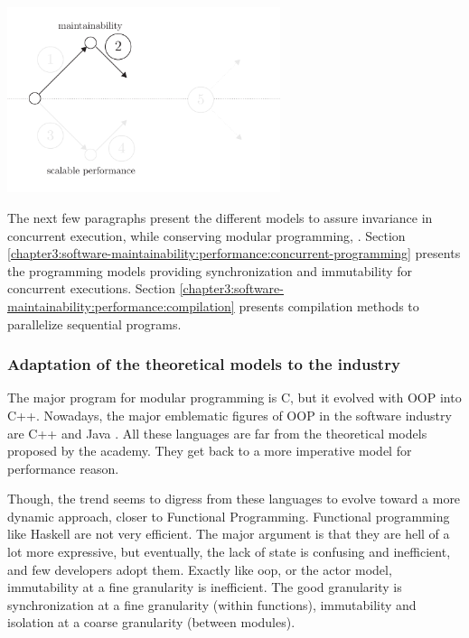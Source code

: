 \begin{center}
\includegraphics[width=0.6\textwidth]{../ressources/state-of-the-art-2.pdf}
\end{center}

The next few paragraphs present the different models to assure invariance in concurrent execution, while conserving modular programming, .
Section \ref{chapter3:software-maintainability:performance:concurrent-programming} presents the programming models providing synchronization and immutability for concurrent executions.
Section \ref{chapter3:software-maintainability:performance:compilation} presents compilation methods to parallelize sequential programs.



\subsubsection{Adaptation of the theoretical models to the industry}

The major program for modular programming is C, but it evolved with OOP into C++.
Nowadays, the major emblematic figures of OOP in the software industry are C++ and Java \cite{Gosling2000,Stroustrup1986}.
All these languages are far from the theoretical models proposed by the academy.
They get back to a more imperative model for performance reason.

Though, the trend seems to digress from these languages to evolve toward a more dynamic approach, closer to Functional Programming.
Functional programming like Haskell are not very efficient.
The major argument is that they are hell of a lot more expressive, but eventually, the lack of state is confusing and inefficient, and few developers adopt them.
Exactly like oop, or the actor model, immutability at a fine granularity is inefficient.
The good granularity is synchronization at a fine granularity (within functions), immutability and isolation at a coarse granularity (between modules).

